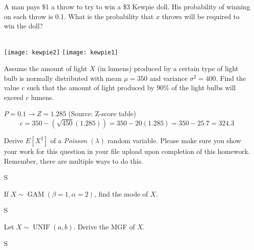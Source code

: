 \documentclass[answers]{exam}
\begin{document}
\begin{questions}
\question 
A man pays \$1 a throw to try to win a \$3 Kewpie doll. His probability of winning on each throw is 0.1. What is the probability that $x$ throws will be required to win the doll?
\begin{solution} \\
	\texttt{[image: kewpie2]}
	\hspace*{\fill}
	\hspace*{\fill}
	\texttt{[image: kewpie1]}
\end{solution}

\question 
Assume the amount of light $X$ (in lumens) produced by a certain type of light bulb is normally distributed with mean \(\mu=350\) and variance \(\sigma^2=400\). Find the value $c$ such that the amount of light produced by 90\% of the light bulbs will exceed $c$ lumens.
\begin{solution}
	\(P = 0.1 \rightarrow Z = 1.285\) (Source: Z-score table) \\
	\[c = 350 - (\sqrt{450}(1.285)) = 350 - 20(1.285) = 350 - 25.7 = 324.3\]
\end{solution}

\question 
Derive \(E[X^2]\) of a \emph{Poisson} \((\lambda)\) random variable. Please make sure you show your work for this question in your file upload upon completion of this homework. Remember, there are multiple ways to do this.
\begin{solution}
	S
\end{solution}

\question 
If \(X\sim\operatorname{GAM}(\beta=1,\alpha=2)\), find the mode of $X$.
\begin{solution}
	S
\end{solution}

\question 
Let \(X\sim\operatorname{UNIF}(a,b)\). Derive the MGF of $X$.
\begin{solution}
	S
\end{solution}


\end{questions}
\end{document}

